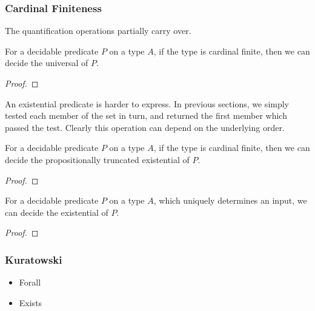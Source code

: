 \begin{refsection}
\subsubsection{Cardinal Finiteness}
The quantification operations partially carry over.
\begin{theorem}
  For a decidable predicate \(P\) on a type \(A\), if the type is cardinal
  finite, then we can decide the universal of \(P\).
\end{theorem}
\begin{proof}
\end{proof}

An existential predicate is harder to express.
In previous sections, we simply tested each member of the set in turn, and
returned the first member which passed the test.
Clearly this operation can depend on the underlying order.
\begin{theorem}
  For a decidable predicate \(P\) on a type \(A\), if the type is cardinal
  finite, then we can decide the propositionally truncated existential of \(P\).
\end{theorem}
\begin{proof}
\end{proof}
\begin{theorem}
  For a decidable predicate \(P\) on a type \(A\), which uniquely determines an
  input, we can decide the existential of \(P\).
\end{theorem}
\begin{proof}
\end{proof}
\subsubsection{Kuratowski}
\begin{itemize}
\item Forall
\item Exists
\end{itemize}


\end{refsection}
